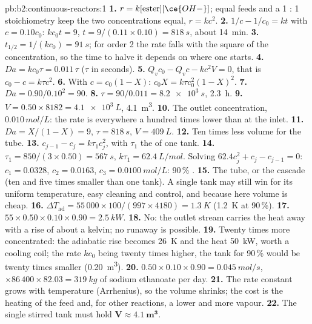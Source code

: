 \begin{solution}{pb:b2:continuous-reactors:1}
\textbf{1.} $r = k[\text{ester}][\ce{OH-}]$; equal feeds and a 1 : 1
stoichiometry keep the two concentrations equal, $r = kc^2$.
\textbf{2.} $1/c - 1/c_0 = kt$ with $c = 0.10c_0$: $kc_0t = 9$, $t = 9/(0.11
\times 0.10) = \qty{818}{s}$, about \qty{14}{min}.
\textbf{3.} $t_{1/2} = 1/(kc_0) = \qty{91}{s}$; for order 2 the rate falls with
the square of the concentration, so the time to halve it depends on where one
starts.
\textbf{4.} $Da = kc_0\tau = 0.011\,\tau$ ($\tau$ in seconds).
\textbf{5.} $Q_vc_0 - Q_vc - kc^2V = 0$, that is $c_0 - c = k\tau c^2$.
\textbf{6.} With $c = c_0(1 - X)$: $c_0X = k\tau c_0^2(1 - X)^2$.
\textbf{7.} $Da = 0.90/0.10^2 = 90$.
\textbf{8.} $\tau = 90/0.011 = \qty{8.2e3}{s}$, \qty{2.3}{h}.
\textbf{9.} $V = 0.50 \times 8182 = \qty{4.1e3}{L}$, \qty{4.1}{m^3}.
\textbf{10.} The outlet concentration, $0.010\,\unit{mol/L}$: the rate is
everywhere a hundred times lower than at the inlet.
\textbf{11.} $Da = X/(1 - X) = 9$, $\tau = \qty{818}{s}$, $V = \qty{409}{L}$.
\textbf{12.} Ten times less volume for the tube.
\textbf{13.} $c_{j-1} - c_j = k\tau_1c_j^2$, with $\tau_1$ the  of
one tank.
\textbf{14.} $\tau_1 = 850/(3 \times 0.50) = \qty{567}{s}$, $k\tau_1 =
\qty{62.4}{L/mol}$. Solving $62.4c_j^2 + c_j - c_{j-1} = 0$: $c_1 = 0.0328$,
$c_2 = 0.0163$, $c_3 = \qty{0.0100}{mol/L}$: 90\,\% .
\textbf{15.} The tube, or the cascade (ten and five times smaller than one
tank). A single tank may still win for its uniform temperature, easy
cleaning and control, and because here volume is cheap.
\textbf{16.} $\Delta T_{\text{ad}} = 55\,000 \times 100/(997 \times 4180) =
\qty{1.3}{K}$ (\qty{1.2}{K} at 90\,\%).
\textbf{17.} $55 \times 0.50 \times 0.10 \times 0.90 = \qty{2.5}{kW}$.
\textbf{18.} No: the outlet stream carries the heat away with a rise of about
a kelvin; no runaway is possible.
\textbf{19.} Twenty times more concentrated: the adiabatic rise becomes
\qty{26}{K} and the heat \qty{50}{kW}, worth a cooling coil; the rate $kc_0$
being twenty times higher, the tank for 90\,\% would be twenty times smaller
(\qty{0.20}{m^3}).
\textbf{20.} $0.50 \times 0.10 \times 0.90 = \qty{0.045}{mol/s}$, $\times 86\,400
\times 82.03 = \qty{319}{kg}$ of sodium ethanoate per day.
\textbf{21.} The rate constant grows with temperature (Arrhenius), so the
volume shrinks; the cost is the heating of the feed and, for other
reactions, a lower  and more vapour.
\textbf{22.} The single stirred tank must hold $\boldsymbol{V \approx
\qty{4.1}{m^3}}$.
\end{solution}
